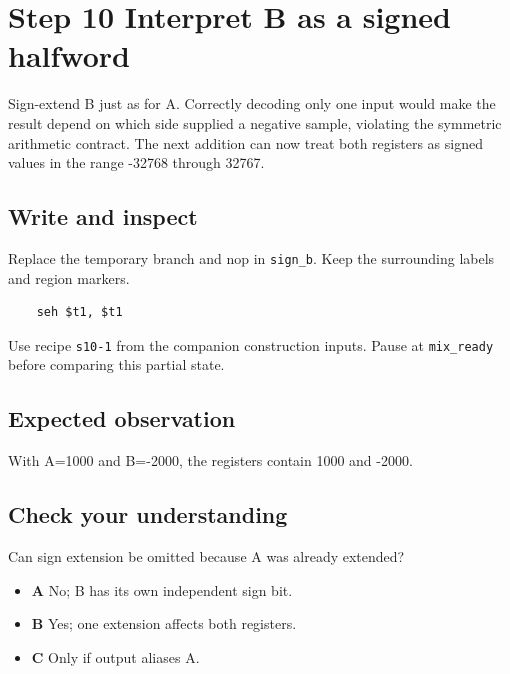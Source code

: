 \section{Step 10 Interpret B as a signed halfword}\label{pcm-s10}

Sign-extend B just as for A. Correctly decoding only one input would make the result depend on which side supplied a negative sample, violating the symmetric arithmetic contract. The next addition can now treat both registers as signed values in the range -32768 through 32767.

\subsection{Write and inspect}
Replace the temporary branch and nop in \texttt{sign\_b}. Keep the surrounding labels and region markers.

\begin{verbatim}
    seh $t1, $t1
\end{verbatim}
Use recipe \texttt{s10-1} from the companion construction inputs. Pause at \texttt{mix\_ready} before comparing this partial state.

\subsection{Expected observation}
With A=1000 and B=-2000, the registers contain 1000 and -2000.

\subsection{Check your understanding}
Can sign extension be omitted because A was already extended?

\begin{itemize}
  \item \textbf{A} No; B has its own independent sign bit.
  \item \textbf{B} Yes; one extension affects both registers.
  \item \textbf{C} Only if output aliases A.
\end{itemize}
